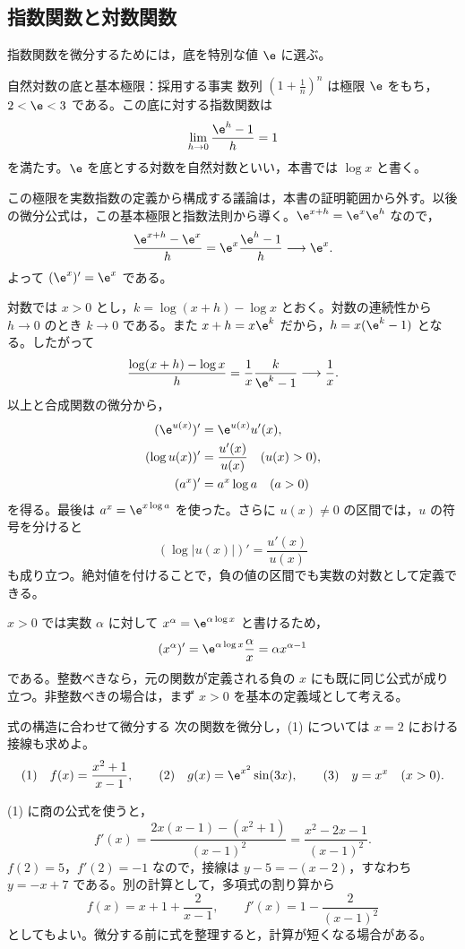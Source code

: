 \subsection{指数関数と対数関数}
指数関数を微分するためには，底を特別な値 $\e$ に選ぶ。
\begin{theorem}{自然対数の底と基本極限：採用する事実}
数列 $\left(1+\frac1n\right)^n$ は極限 $\e$ をもち，$2<\e<3$ である。この底に対する指数関数は
\[
 \lim_{h\to0}\frac{\e^h-1}{h}=1
\]
を満たす。$\e$ を底とする対数を自然対数といい，本書では $\log x$ と書く。
\end{theorem}

この極限を実数指数の定義から構成する議論は，本書の証明範囲から外す。以後の微分公式は，この基本極限と指数法則から導く。$\e^{x+h}=\e^x\e^h$ なので，
\[
 \frac{\e^{x+h}-\e^x}{h}
 =\e^x\frac{\e^h-1}{h}\longrightarrow\e^x.
\]
よって $(\e^x)'=\e^x$ である。

対数では $x>0$ とし，$k=\log(x+h)-\log x$ とおく。対数の連続性から $h\to0$ のとき $k\to0$ である。また $x+h=x\e^k$ だから，$h=x(\e^k-1)$ となる。したがって
\[
 \frac{\log(x+h)-\log x}{h}
 =\frac1x\frac{k}{\e^k-1}\longrightarrow\frac1x.
\]
以上と合成関数の微分から，
\begin{align*}
 (\e^{u(x)})'&=\e^{u(x)}u'(x),\\
 (\log u(x))'&=\frac{u'(x)}{u(x)}\quad(u(x)>0),\\
 (a^x)'&=a^x\log a\quad(a>0)
\end{align*}
を得る。最後は $a^x=\e^{x\log a}$ を使った。さらに $u(x)\ne0$ の区間では，$u$ の符号を分けると
\[
 (\log|u(x)|)'=\frac{u'(x)}{u(x)}
\]
も成り立つ。絶対値を付けることで，負の値の区間でも実数の対数として定義できる。

$x>0$ では実数 $\alpha$ に対して $x^\alpha=\e^{\alpha\log x}$ と書けるため，
\[
 (x^\alpha)'=\e^{\alpha\log x}\frac\alpha x
 =\alpha x^{\alpha-1}
\]
である。整数べきなら，元の関数が定義される負の $x$ にも既に同じ公式が成り立つ。非整数べきの場合は，まず $x>0$ を基本の定義域として考える。

\begin{example}{式の構造に合わせて微分する}
次の関数を微分し，(1) については $x=2$ における接線も求めよ。
\[
 \text{(1)}\quad f(x)=\frac{x^2+1}{x-1},\qquad
 \text{(2)}\quad g(x)=\e^{x^2}\sin(3x),\qquad
 \text{(3)}\quad y=x^x\quad(x>0).
\]
\end{example}
(1) に商の公式を使うと，
\[
 f'(x)=\frac{2x(x-1)-(x^2+1)}{(x-1)^2}
      =\frac{x^2-2x-1}{(x-1)^2}.
\]
$f(2)=5$，$f'(2)=-1$ なので，接線は $y-5=-(x-2)$，すなわち $y=-x+7$ である。別の計算として，多項式の割り算から
\[
 f(x)=x+1+\frac2{x-1},\qquad
 f'(x)=1-\frac2{(x-1)^2}
\]
としてもよい。微分する前に式を整理すると，計算が短くなる場合がある。


